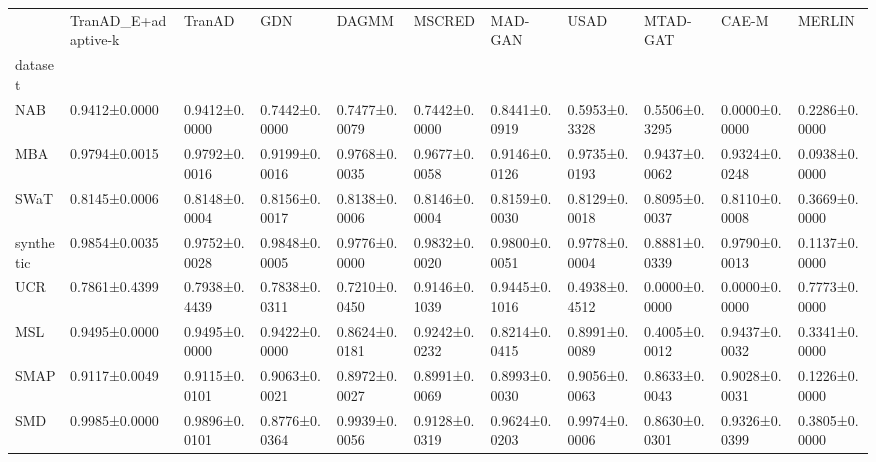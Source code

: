 \begin{tabular}{lllllllllll}
\toprule
 & TranAD_E+adaptive-k & TranAD & GDN & DAGMM & MSCRED & MAD-GAN & USAD & MTAD-GAT & CAE-M & MERLIN \\
dataset &  &  &  &  &  &  &  &  &  &  \\
\midrule
NAB & 0.9412±0.0000 & 0.9412±0.0000 & 0.7442±0.0000 & 0.7477±0.0079 & 0.7442±0.0000 & 0.8441±0.0919 & 0.5953±0.3328 & 0.5506±0.3295 & 0.0000±0.0000 & 0.2286±0.0000 \\
MBA & 0.9794±0.0015 & 0.9792±0.0016 & 0.9199±0.0016 & 0.9768±0.0035 & 0.9677±0.0058 & 0.9146±0.0126 & 0.9735±0.0193 & 0.9437±0.0062 & 0.9324±0.0248 & 0.0938±0.0000 \\
SWaT & 0.8145±0.0006 & 0.8148±0.0004 & 0.8156±0.0017 & 0.8138±0.0006 & 0.8146±0.0004 & 0.8159±0.0030 & 0.8129±0.0018 & 0.8095±0.0037 & 0.8110±0.0008 & 0.3669±0.0000 \\
synthetic & 0.9854±0.0035 & 0.9752±0.0028 & 0.9848±0.0005 & 0.9776±0.0000 & 0.9832±0.0020 & 0.9800±0.0051 & 0.9778±0.0004 & 0.8881±0.0339 & 0.9790±0.0013 & 0.1137±0.0000 \\
UCR & 0.7861±0.4399 & 0.7938±0.4439 & 0.7838±0.0311 & 0.7210±0.0450 & 0.9146±0.1039 & 0.9445±0.1016 & 0.4938±0.4512 & 0.0000±0.0000 & 0.0000±0.0000 & 0.7773±0.0000 \\
MSL & 0.9495±0.0000 & 0.9495±0.0000 & 0.9422±0.0000 & 0.8624±0.0181 & 0.9242±0.0232 & 0.8214±0.0415 & 0.8991±0.0089 & 0.4005±0.0012 & 0.9437±0.0032 & 0.3341±0.0000 \\
SMAP & 0.9117±0.0049 & 0.9115±0.0101 & 0.9063±0.0021 & 0.8972±0.0027 & 0.8991±0.0069 & 0.8993±0.0030 & 0.9056±0.0063 & 0.8633±0.0043 & 0.9028±0.0031 & 0.1226±0.0000 \\
SMD & 0.9985±0.0000 & 0.9896±0.0101 & 0.8776±0.0364 & 0.9939±0.0056 & 0.9128±0.0319 & 0.9624±0.0203 & 0.9974±0.0006 & 0.8630±0.0301 & 0.9326±0.0399 & 0.3805±0.0000 \\
\bottomrule
\end{tabular}

